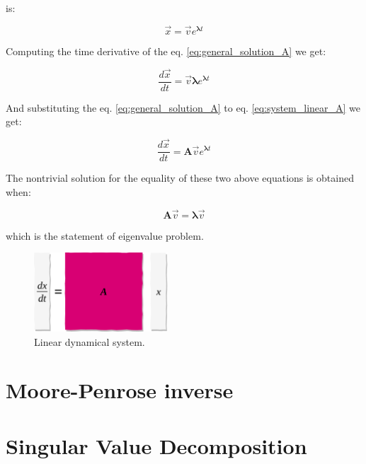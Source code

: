 \documentclass[10pt,twocolumn]{article}
\begin{document}
is:

\begin{equation} \label{eq:general_solution_A}
\vec{x} = \vec{v} e^{\bm{\lambda} t}
\end{equation}

Computing the time derivative of the eq. \ref{eq:general_solution_A} we get:

\begin{equation} \label{eq:sub1}
\frac{d \vec{x}}{dt} = \vec{v} \bm{\lambda} e^{\bm{\lambda} t}
\end{equation}

And substituting the eq. \ref{eq:general_solution_A} to eq. \ref{eq:system_linear_A} we get:

\begin{equation} \label{eq:sub2}
\frac{d \vec{x}}{dt} = \bm{A} \vec{v} e^{\bm{\lambda} t}
\end{equation}

The nontrivial solution for the equality of these two above equations is obtained when:

\begin{equation} \label{eq:eigval}
\bm{A} \vec{v} = \bm{\lambda} \vec{v} 
\end{equation}

which is the statement of eigenvalue problem.



\begin{figure}[H]
\centering\includegraphics[width=5cm]{lin-dyn.png}
\caption{Linear dynamical system.}
\label{fig:linear_system}
\end{figure}










\section{Moore-Penrose inverse} \label{app:B}




\section{Singular Value Decomposition} \label{app:C}
\end{document}
